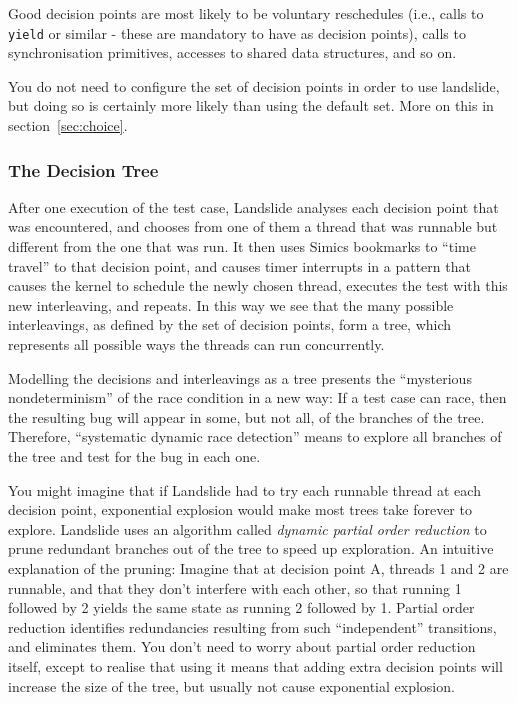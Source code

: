 \documentclass{article}
\begin{document}
Good decision points are most likely to be voluntary reschedules (i.e., calls to \texttt{yield} or similar - these are mandatory to have as decision points), calls to synchronisation primitives, accesses to shared data structures, and so on.

You do not need to configure the set of decision points in order to use landslide, but doing so is certainly more likely than using the default set. More on this in section~\ref{sec:choice}.

\subsubsection{The Decision Tree}

After one execution of the test case, Landslide analyses each decision point that was encountered, and chooses from one of them a thread that was runnable but different from the one that was run. It then uses Simics bookmarks to ``time travel'' to that decision point, and causes timer interrupts in a pattern that causes the kernel to schedule the newly chosen thread, executes the test with this new interleaving, and repeats. In this way we see that the many possible interleavings, as defined by the set of decision points, form a tree, which represents all possible ways the threads can run concurrently.

Modelling the decisions and interleavings as a tree presents the ``mysterious nondeterminism'' of the race condition in a new way: If a test case can race, then the resulting bug will appear in some, but not all, of the branches of the tree.
Therefore, ``systematic dynamic race detection'' means to explore all branches of the tree and test for the bug in each one.

You might imagine that if Landslide had to try each runnable thread at each decision point, exponential explosion would make most trees take forever to explore.
Landslide uses an algorithm called {\em dynamic partial order reduction} to prune redundant branches out of the tree to speed up exploration. %
An intuitive explanation of the pruning: Imagine that at decision point A, threads 1 and 2 are runnable, and that they don't interfere with each other, so that running 1 followed by 2 yields the same state as running 2 followed by 1.
Partial order reduction identifies redundancies resulting from such ``independent'' transitions, and eliminates them.
You don't need to worry about partial order reduction itself, except to realise that using it means that adding extra decision points will increase the size of the tree, but usually not cause exponential explosion.
\end{document}
